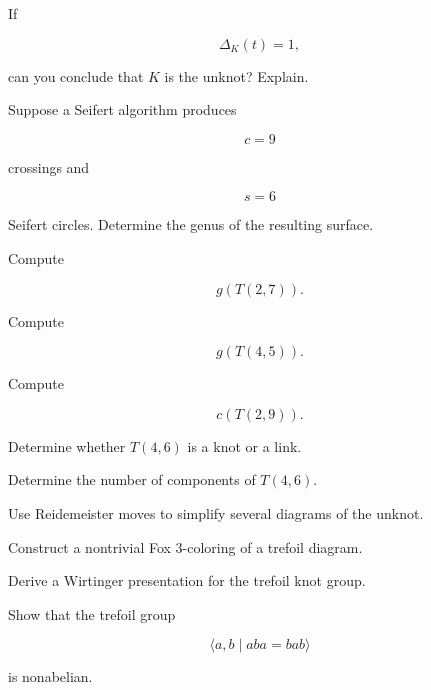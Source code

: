 \begin{exercise}[2]
If

\[
\Delta_K(t)=1,
\]

can you conclude that \(K\) is the unknot? Explain.
\end{exercise}

\begin{exercise}[2]
Suppose a Seifert algorithm produces

\[
c=9
\]

crossings and

\[
s=6
\]

Seifert circles. Determine the genus of the resulting surface.
\end{exercise}

\begin{exercise}[2]
Compute

\[
g(T(2,7)).
\]
\end{exercise}

\begin{exercise}[2]
Compute

\[
g(T(4,5)).
\]
\end{exercise}

\begin{exercise}[2]
Compute

\[
c(T(2,9)).
\]
\end{exercise}

\begin{exercise}[2]
Determine whether \(T(4,6)\) is a knot or a link.
\end{exercise}

\begin{exercise}[2]
Determine the number of components of \(T(4,6)\).
\end{exercise}

\begin{exercise}[3]
Use Reidemeister moves to simplify several diagrams of the unknot.
\end{exercise}

\begin{exercise}[3]
Construct a nontrivial Fox \(3\)-coloring of a trefoil diagram.
\end{exercise}

\begin{exercise}[3]
Derive a Wirtinger presentation for the trefoil knot group.
\end{exercise}

\begin{exercise}[3]
Show that the trefoil group

\[
\langle a,b\mid aba=bab\rangle
\]

is nonabelian.
\end{exercise}

